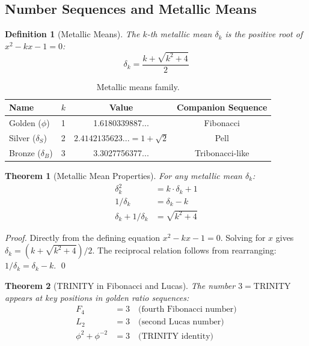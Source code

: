 \documentclass[aps,prd,preprint,superscriptaddress,showpacs,nofootinbib,longbibliography]{revtex4-2}
\newtheorem{theorem}{Theorem}
\newtheorem{definition}{Definition}
\begin{document}
\subsection{Number Sequences and Metallic Means}
\label{sec:sequences}

\begin{definition}[Metallic Means]
\label{def:metallic}
The $k$-th \emph{metallic mean} $\delta_k$ is the positive root of $x^2 - kx - 1 = 0$:
\begin{equation}
\delta_k = \frac{k + \sqrt{k^2 + 4}}{2}
\end{equation}
\end{definition}

\begin{table}[h]
\centering
\begin{tabular}{lccc}
\toprule
\textbf{Name} & $k$ & \textbf{Value} & \textbf{Companion Sequence} \\
\midrule
Golden ($\phi$) & 1 & 1.6180339887... & Fibonacci \\
Silver ($\delta_S$) & 2 & $2.4142135623... = 1+\sqrt{2}$ & Pell \\
Bronze ($\delta_B$) & 3 & 3.3027756377... & Tribonacci-like \\
\bottomrule
\end{tabular}
\caption{Metallic means family.}
\label{tab:metallic}
\end{table}

\begin{theorem}[Metallic Mean Properties]
\label{thm:metallic_prop}
For any metallic mean $\delta_k$:
\begin{align}
\delta_k^2 &= k \cdot \delta_k + 1 \label{eq:metallic_def} \\
1/\delta_k &= \delta_k - k \label{eq:metallic_inv} \\
\delta_k + 1/\delta_k &= \sqrt{k^2 + 4} \label{eq:metallic_sum}
\end{align}
\end{theorem}

\begin{proof}
Directly from the defining equation $x^2 - kx - 1 = 0$. Solving for $x$ gives $\delta_k = (k + \sqrt{k^2+4})/2$. The reciprocal relation follows from rearranging: $1/\delta_k = \delta_k - k$. \qed
\end{proof}

\begin{theorem}[TRINITY in Fibonacci and Lucas]
\label{thm:fib_lucas_trinity}
The number $3 = \text{TRINITY}$ appears at key positions in golden ratio sequences:
\begin{align}
F_4 &= 3 \quad \text{(fourth Fibonacci number)} \\
L_2 &= 3 \quad \text{(second Lucas number)} \\
\phi^2 + \phi^{-2} &= 3 \quad \text{(TRINITY identity)}
\end{align}
\end{theorem}
\end{document}
